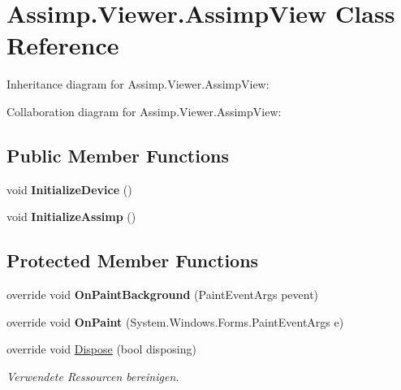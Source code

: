 \hypertarget{class_assimp_1_1_viewer_1_1_assimp_view}{\section{Assimp.\+Viewer.\+Assimp\+View Class Reference}
\label{class_assimp_1_1_viewer_1_1_assimp_view}
}


Inheritance diagram for Assimp.\+Viewer.\+Assimp\+View\+:


Collaboration diagram for Assimp.\+Viewer.\+Assimp\+View\+:
\subsection*{Public Member Functions}
\begin{DoxyCompactItemize}
\item 
\hypertarget{class_assimp_1_1_viewer_1_1_assimp_view_a8d1295a02486a168ab5d7ea62eb36d40}{void {\bfseries Initialize\+Device} ()}\label{class_assimp_1_1_viewer_1_1_assimp_view_a8d1295a02486a168ab5d7ea62eb36d40}

\item 
\hypertarget{class_assimp_1_1_viewer_1_1_assimp_view_a5330570fe58d892f57effb2c5d751f96}{void {\bfseries Initialize\+Assimp} ()}\label{class_assimp_1_1_viewer_1_1_assimp_view_a5330570fe58d892f57effb2c5d751f96}

\end{DoxyCompactItemize}
\subsection*{Protected Member Functions}
\begin{DoxyCompactItemize}
\item 
\hypertarget{class_assimp_1_1_viewer_1_1_assimp_view_aa9c5825f08edfde2d6047a2f840e1966}{override void {\bfseries On\+Paint\+Background} (Paint\+Event\+Args pevent)}\label{class_assimp_1_1_viewer_1_1_assimp_view_aa9c5825f08edfde2d6047a2f840e1966}

\item 
\hypertarget{class_assimp_1_1_viewer_1_1_assimp_view_a819d62e0bd0867705c7b08bd27579c06}{override void {\bfseries On\+Paint} (System.\+Windows.\+Forms.\+Paint\+Event\+Args e)}\label{class_assimp_1_1_viewer_1_1_assimp_view_a819d62e0bd0867705c7b08bd27579c06}

\item 
override void \hyperlink{class_assimp_1_1_viewer_1_1_assimp_view_a76ebdf7f450882a076c674533cf78aaa}{Dispose} (bool disposing)
\begin{DoxyCompactList}\small\item\em Verwendete Ressourcen bereinigen. \end{DoxyCompactList}\end{DoxyCompactItemize}


